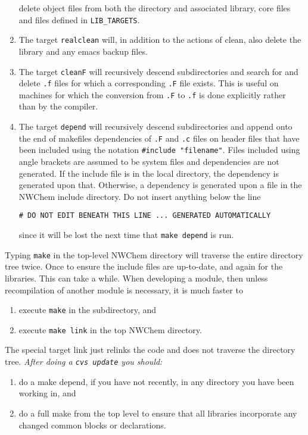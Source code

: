 \begin{enumerate}
  delete object files from both the directory and associated library, 
  core files and files defined in {\tt LIB\_TARGETS}.
\item The target {\tt realclean} will, in addition to the actions of
  clean, also delete the library and any emacs backup files.
\item The target {\tt cleanF} will recursively descend subdirectories
  and search for and delete \verb+.f+ files for which a corresponding
  \verb+.F+ file exists.  This is useful on machines for which the
  conversion from \verb+.F+ to \verb+.f+ is done explicitly rather
  than by the compiler.
\item The target {\tt depend} will recursively descend subdirectories
  and append onto the end of makefiles dependencies of \verb+.F+ and
  \verb+.c+ files on header files that have been included using the
  notation \verb+#include "filename"+.  Files included using angle
  brackets are assumed to be system files and dependencies are not
  generated.  If the include file is in the local directory, the
  dependency is generated upon that.  Otherwise, a dependency is
  generated upon a file in the NWChem include directory.
  Do not insert anything below the line
\begin{verbatim}
# DO NOT EDIT BENEATH THIS LINE ... GENERATED AUTOMATICALLY
\end{verbatim}
  since it will be lost the next time that \verb+make depend+
  is run.
\end{enumerate}

Typing {\tt make} in the top-level NWChem directory will traverse the
entire directory tree twice.  Once to ensure the include files are
up-to-date, and again for the libraries.  This can take a while.
When developing a module, then unless recompilation of another module
is necessary, it is much faster to 
\begin{enumerate}
\item execute {\tt make} in the subdirectory, and
\item execute {\tt make link} in the top NWChem directory.
\end{enumerate}
The special target link just relinks the code and does not traverse
the directory tree.  {\em After doing a \verb+cvs update+ you should:}
\begin{enumerate}
\item do a make depend, if you have not recently, in any directory you
  have been working in, and
\item do a full make from the top level to ensure that all libraries
  incorporate any changed common blocks or declarations.
\end{enumerate}

